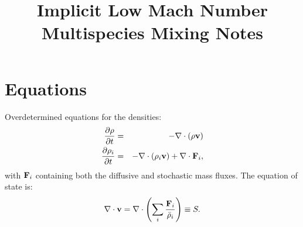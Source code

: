 \documentclass[final]{siamltex}
\def\Fb {{\bf F}}
\def\vb {{\bf v}}
\begin{document}
\title{Implicit Low Mach Number Multispecies Mixing Notes}

\maketitle

\section{Equations}
Overdetermined equations for the densities:
\begin{eqnarray}
\frac{\partial\rho}{\partial t} &=& -\nabla\cdot(\rho\vb)\\
\frac{\partial\rho_i}{\partial t} &=& -\nabla\cdot(\rho_i\vb) + \nabla\cdot\Fb_i,
\end{eqnarray}
with $\Fb_i$ containing both the diffusive and stochastic mass fluxes.  The equation of state is:
\begin{equation}
\nabla\cdot\vb = \nabla\cdot\left(\sum_i\frac{\Fb_i}{\bar\rho_i}\right) \equiv S\label{eq:S}.
\end{equation}
\end{document}
